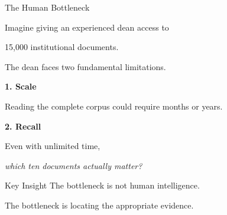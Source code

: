 \documentclass[aspectratio=169]{beamer}
\begin{document}
\begin{frame}{The Human Bottleneck}

Imagine giving an experienced dean access to

\vspace{0.2cm}

\Large

\centering

15,000 institutional documents.

\normalsize

\vspace{0.6cm}

The dean faces two fundamental limitations.

\bigskip

\textbf{1. Scale}

Reading the complete corpus could require months or years.

\bigskip

\textbf{2. Recall}

Even with unlimited time,

\emph{which ten documents actually matter?}

\vspace{0.2cm}

\begin{alertblock}{Key Insight}
The bottleneck is not human intelligence.

The bottleneck is locating the appropriate evidence.
\end{alertblock}

\end{frame}


\end{document}

